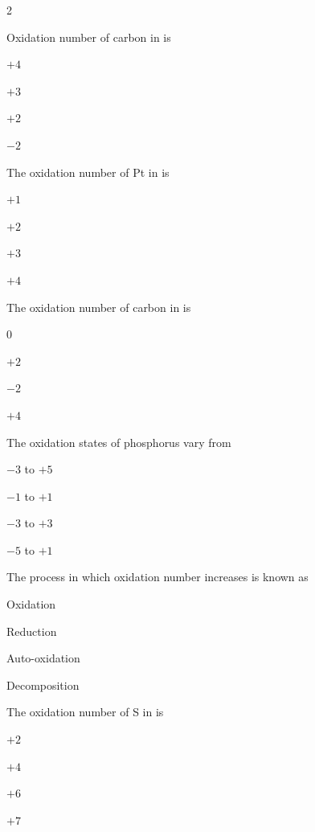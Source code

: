 \documentclass[10pt,a4paper]{article}
\begin{document}
\begin{multicols}{2}
\begin{questions}[start=1]
\item Oxidation number of carbon in  is
\begin{options}
  \item $+4$
  \item $+3$
  \item $+2$
  \item $-2$
\end{options}

\item The oxidation number of Pt in \ce{[Pt(C2H4)Cl3]-} is
\begin{options}
  \item $+1$
  \item $+2$
  \item $+3$
  \item $+4$
\end{options}

\item The oxidation number of carbon in  is
\begin{options}
  \item 0
  \item $+2$
  \item $-2$
  \item $+4$
\end{options}

\item The oxidation states of phosphorus vary from
\begin{options}
  \item $-3$ to $+5$
  \item $-1$ to $+1$
  \item $-3$ to $+3$
  \item $-5$ to $+1$
\end{options}

\item The process in which oxidation number increases is known as
\begin{options}
  \item Oxidation
  \item Reduction
  \item Auto-oxidation
  \item Decomposition
\end{options}

\item The oxidation number of S in  is
\begin{options}
  \item $+2$
  \item $+4$
  \item $+6$
  \item $+7$
\end{options}


\end{questions}
\end{multicols}
\end{document}
